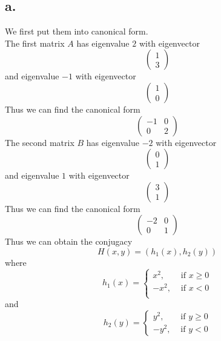 \documentclass[11pt]{article}
\theoremstyle{mystyle}
\theoremstyle{definition}
\begin{document}
\subsection*{a.}
We first put them into canonical form. \\
The first matrix $A$ has eigenvalue $2$ with eigenvector 
\[
  \begin{pmatrix}
    1 \\
    3
  \end{pmatrix}
\]
and eigenvalue $-1$ with eigenvector 
\[
  \begin{pmatrix}
    1 \\ 
    0
  \end{pmatrix}
\]
Thus we can find the canonical form 
\[
\begin{pmatrix}
  -1 & 0 \\
  0 & 2
\end{pmatrix}  
\]
The second matrix $B$ has eigenvalue $-2$ with eigenvector 
\[
  \begin{pmatrix}
    0 \\
    1
  \end{pmatrix}
\]
and eigenvalue $1$ with eigenvector 
\[
  \begin{pmatrix}
    3 \\ 
    1
  \end{pmatrix}
\]
Thus we can find the canonical form 
\[
\begin{pmatrix}
  -2 & 0 \\
  0 & 1
\end{pmatrix}  
\]
Thus we can obtain the conjugacy
\[
  H(x,y) = (h_1(x), h_2(y))
\]
where 
\[
  h_1(x) = 
  \begin{cases}
    x^2, &\text{ if } x \ge 0\\
    -x^2, &\text{ if } x < 0\\
  \end{cases}
\]
and 
\[
  h_2(y) = 
  \begin{cases}
    y^2, &\text{ if } y \ge 0 \\
    -y^2, &\text{ if } y < 0
  \end{cases}
\]
\end{document}

